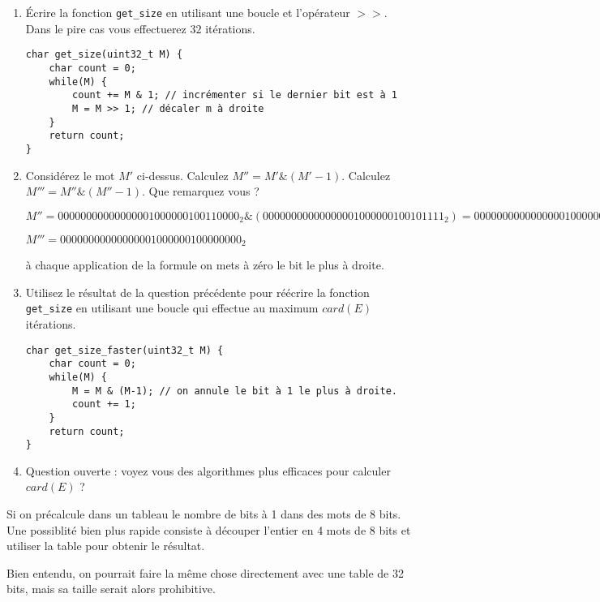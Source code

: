 \documentclass[a4paper,10pt]{exam}
\begin{document}
\begin{enumerate}
\item Écrire la fonction \texttt{get\_size} en utilisant une boucle et
  l'opérateur $>>$.  Dans le pire cas vous effectuerez $32$ itérations.
\begin{solution}
\begin{verbatim}
char get_size(uint32_t M) {
    char count = 0;
    while(M) {
	    count += M & 1; // incrémenter si le dernier bit est à 1
	    M = M >> 1; // décaler m à droite
    }
    return count;
}
\end{verbatim}
\end{solution}

\item Considérez le mot $M'$ ci-dessus. Calculez $M'' = M' \& (M'-1)$.
Calculez $M''' = M'' \& (M''-1)$. Que remarquez vous ?
\begin{solution}
$M'' = 00000000000000001000000100110000_2 \& (00000000000000001000000100101111_2)
     = 00000000000000001000000100100000_2$

$M''' = 00000000000000001000000100000000_2$

à chaque application de la formule on mets à zéro le bit le plus à droite.
\end{solution}

\item Utilisez le résultat de la question précédente pour réécrire la
fonction \texttt{get\_size} en utilisant une boucle qui effectue au
maximum $card(E)$ itérations.

\begin{solution}
\begin{verbatim}
char get_size_faster(uint32_t M) {
    char count = 0;
    while(M) {
	    M = M & (M-1); // on annule le bit à 1 le plus à droite.
	    count += 1;
    }
    return count;
}
\end{verbatim}
\end{solution}

\item Question ouverte : voyez vous des algorithmes plus efficaces pour calculer
  $card(E)$ ?
\end{enumerate}
\begin{solution}
  Si on précalcule dans un tableau le nombre de bits à 1 dans des mots de 8 bits.
  Une possiblité bien plus rapide consiste à découper l'entier en 4 mots de 8
  bits et utiliser la table pour obtenir le résultat.

  Bien entendu, on pourrait faire la même chose directement avec une table de 32
  bits, mais sa taille serait alors prohibitive.
\end{solution}
\end{document}
